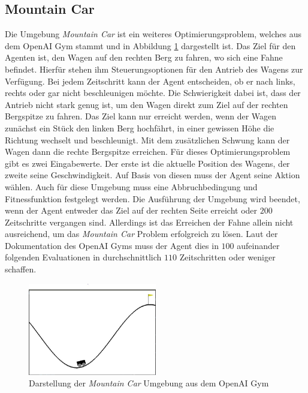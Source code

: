 \subsection{Mountain Car}
\label{subsec:analysis_mountain_car}
Die Umgebung \emph{Mountain Car} ist ein weiteres Optimierungsproblem, welches aus dem OpenAI Gym stammt und in Abbildung \ref{fig:mountain_car_env} dargestellt ist. Das Ziel für den Agenten ist, den Wagen auf den rechten Berg zu fahren, wo sich eine Fahne befindet. Hierfür stehen ihm Steuerungsoptionen für den Antrieb des Wagens zur Verfügung. Bei jedem Zeitschritt kann der Agent entscheiden, ob er nach links, rechts oder gar nicht beschleunigen möchte. Die Schwierigkeit dabei ist, dass der Antrieb nicht stark genug ist, um den Wagen direkt zum Ziel auf der rechten Bergspitze zu fahren. Das Ziel kann nur erreicht werden, wenn der Wagen zunächst ein Stück den linken Berg hochfährt, in einer gewissen Höhe die Richtung wechselt und beschleunigt. Mit dem zusätzlichen Schwung kann der Wagen dann die rechte Bergspitze erreichen. Für dieses Optimierungsproblem gibt es zwei Eingabewerte. Der erste ist die aktuelle Position des Wagens, der zweite seine Geschwindigkeit. Auf Basis von diesen muss der Agent seine Aktion wählen. Auch für diese Umgebung muss eine Abbruchbedingung und Fitnessfunktion festgelegt werden. Die Ausführung der Umgebung wird beendet, wenn der Agent entweder das Ziel auf der rechten Seite erreicht oder $200$ Zeitschritte vergangen sind. Allerdings ist das Erreichen der Fahne allein nicht ausreichend, um das \emph{Mountain Car} Problem erfolgreich zu lösen. Laut der Dokumentation des OpenAI Gyms muss der Agent dies in $100$ aufeinander folgenden Evaluationen in durchschnittlich $110$ Zeitschritten oder weniger schaffen.
\begin{figure}[!h]
	\centering
	\includegraphics[width=0.5\textwidth]{./img/mountain_car_env.JPG} 
	\caption{Darstellung der \emph{Mountain Car} Umgebung aus dem OpenAI Gym}
	\label{fig:mountain_car_env}
\end{figure} 
\\\\
